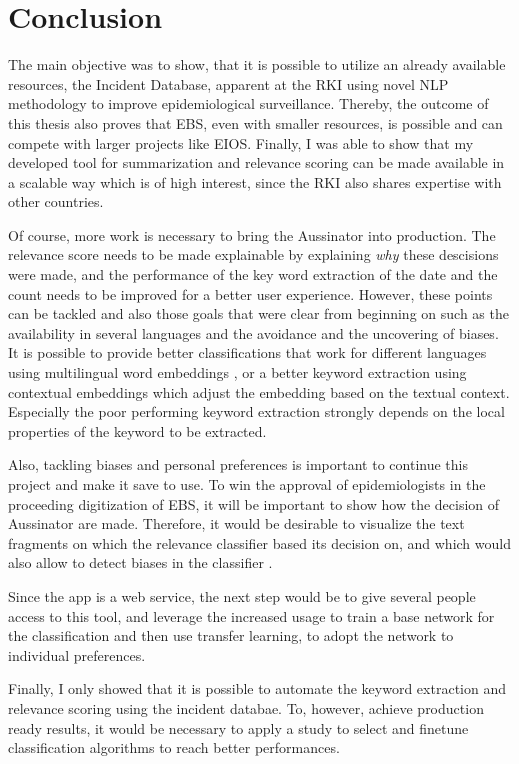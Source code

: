 \chapter{Conclusion}
  The main objective was to show, that it is possible to utilize an already available resources, the Incident Database, apparent at the RKI using novel NLP methodology to improve epidemiological surveillance.
  Thereby, the outcome of this thesis also proves that EBS, even with smaller resources, is possible and can compete with larger projects like EIOS.
  Finally, I was able to show that my developed tool for summarization and relevance scoring can be made available in a scalable way which is of high interest, since the RKI also shares expertise with other countries.

  Of course, more work is necessary to bring the Aussinator into production.
  The relevance score needs to be made explainable by explaining \emph{why} these descisions were made, and the performance of the key word extraction of the date and the count needs to be improved for a better user experience.
  However, these points can be tackled and also those goals that were clear from beginning on such as the availability in several languages and the avoidance and the uncovering of biases.
  It is possible to provide better classifications that work for different languages using multilingual word embeddings \citep{Chen2018}, or a better keyword extraction using contextual embeddings \citep{Devlin2018, Peters2018} which adjust the embedding based on the textual context.
  Especially the poor performing keyword extraction strongly depends on the local properties of the keyword to be extracted.

  Also, tackling biases and personal preferences is important to continue this project and make it save to use.
  To win the approval of epidemiologists in the proceeding digitization of EBS, it will be important to show how the decision of Aussinator are made.
  Therefore, it would be desirable to visualize the text fragments on which the relevance classifier based its decision on, and which would also allow to detect biases in the classifier \citep{Arras2017}.

  Since the app is a web service, the next step would be to give several people access to this tool, and leverage the increased usage to train a base network for the classification and then use transfer learning, to adopt the network to individual preferences.

  Finally, I only showed that it is possible to automate the keyword extraction and relevance scoring using the incident databae. To, however, achieve production ready results, it would be necessary to apply a study to select and finetune classification algorithms to reach better performances.
